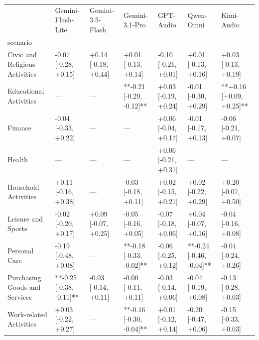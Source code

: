\begin{tabular}{lllllll}
\toprule
 & Gemini-Flash-Lite & Gemini-3.5-Flash & Gemini-3.1-Pro & GPT-Audio & Qwen-Omni & Kimi-Audio \\
scenario &  &  &  &  &  &  \\
\midrule
Civic and Religious Activities & -0.07 [-0.28, +0.15] & +0.14 [-0.18, +0.44] & +0.01 [-0.13, +0.14] & -0.10 [-0.21, +0.01] & +0.01 [-0.13, +0.16] & +0.03 [-0.13, +0.19] \\
Educational Activities & — & — & **-0.21 [-0.29, -0.12]** & +0.03 [-0.19, +0.24] & -0.01 [-0.30, +0.29] & **+0.16 [+0.09, +0.25]** \\
Finance & -0.04 [-0.33, +0.22] & — & — & +0.06 [-0.04, +0.17] & -0.01 [-0.17, +0.13] & -0.06 [-0.21, +0.07] \\
Health & — & — & — & +0.06 [-0.21, +0.31] & — & — \\
Household Activities & +0.11 [-0.16, +0.38] & — & -0.03 [-0.18, +0.11] & +0.02 [-0.15, +0.21] & +0.02 [-0.22, +0.29] & +0.20 [-0.07, +0.50] \\
Leisure and Sports & -0.02 [-0.20, +0.17] & +0.09 [-0.07, +0.25] & -0.05 [-0.16, +0.05] & -0.07 [-0.18, +0.06] & +0.04 [-0.07, +0.16] & -0.04 [-0.16, +0.08] \\
Personal Care & -0.19 [-0.48, +0.08] & — & **-0.18 [-0.33, -0.02]** & -0.06 [-0.25, +0.12] & **-0.24 [-0.46, -0.04]** & -0.04 [-0.24, +0.26] \\
Purchasing Goods and Services & **-0.25 [-0.38, -0.11]** & -0.03 [-0.14, +0.11] & -0.00 [-0.11, +0.11] & -0.03 [-0.14, +0.06] & -0.04 [-0.19, +0.08] & -0.13 [-0.28, +0.03] \\
Work-related Activities & +0.03 [-0.22, +0.27] & — & **-0.16 [-0.30, -0.04]** & +0.01 [-0.12, +0.14] & -0.20 [-0.47, +0.06] & -0.15 [-0.33, +0.03] \\
\bottomrule
\end{tabular}
